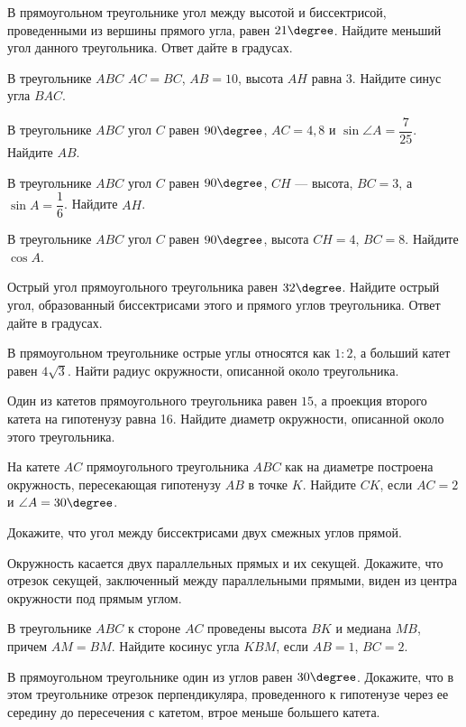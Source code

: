 %
%

\begin{class}[number=1]
	\begin{listofex}
		\item В прямоугольном треугольнике угол между высотой и биссектрисой, проведенными из вершины прямого угла, равен \( 21\degree \). Найдите меньший угол данного треугольника. Ответ дайте в градусах.
		\item В треугольнике \( ABC \) \( AC = BC \), \( AB = 10 \), высота \( AH \) равна \( 3 \). Найдите синус угла \( BAC \).
		\item В треугольнике \( ABC \) угол \( C \) равен \( 90\degree \), \( AC=4,8 \) и \( \sin\angle A = \dfrac{7}{25} \). Найдите \( AB \).
		\item В треугольнике \( ABC \) угол \( C \) равен \( 90\degree \), \( CH \) --- высота, \( BC=3 \), а \( \sin A=\dfrac{1}{6} \). Найдите \( AH \).
		\item В треугольнике \( ABC \) угол \( C \) равен \( 90\degree \), высота \( CH=4 \), \( BC=8 \). Найдите \( \cos A \).
		\item Острый угол прямоугольного треугольника равен \( 32\degree \). Найдите острый угол, образованный биссектрисами этого и прямого углов треугольника. Ответ дайте в градусах.
		\item В прямоугольном треугольнике острые углы относятся как \( 1:2 \), а больший
		катет равен \( 4\sqrt{3} \). Найти радиус окружности, описанной около треугольника.
		\item Один из катетов прямоугольного треугольника равен \( 15 \), а проекция второго катета на гипотенузу равна 16. Найдите диаметр окружности, описанной около этого треугольника.
		\item На катете \( AC \) прямоугольного треугольника \( ABC \) как на диаметре построена окружность, пересекающая гипотенузу \( AB \) в точке \( K \). Найдите \( CK \), если \( AC = 2 \) и \( \angle A = 30\degree \).
		\item Докажите, что угол между биссектрисами двух смежных углов прямой.
		\item Окружность касается двух параллельных прямых и их секущей. Докажите, что отрезок секущей, заключенный между параллельными прямыми, виден из центра окружности под
		прямым углом.
		\item В треугольнике \( ABC \) к стороне \( AC \) проведены высота \( BK \) и медиана \( MB \), причем \( AM =BM \). Найдите косинус угла \( KBM \), если \( AB=1 \), \( BC = 2 \).
		\item В прямоугольном треугольнике один из углов равен \( 30\degree \). Докажите, что в этом треугольнике отрезок перпендикуляра, проведенного к гипотенузе через ее середину до
		пересечения с катетом, втрое меньше большего катета.
	\end{listofex}
\end{class}

